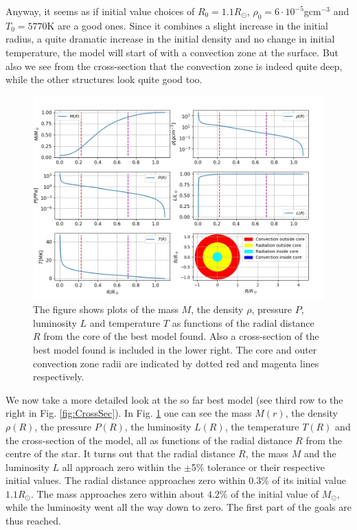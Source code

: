 \documentclass{emulateapj}
\begin{document}
	Anyway, it seems as if initial value choices of $R_0=1.1R_\odot$, $\rho_0 = 6\cdot 10^{-5}$gcm$^{-3}$ and $T_0 = 5770$K are a good ones. Since it combines a slight increase in the initial radius, a quite dramatic increase in the initial density and no change in initial temperature, the model will start of with a convection zone at the surface. But also we see from the cross-section that the convection zone is indeed quite deep, while the other structures look quite good too. 
	
	\begin{figure}
		\includegraphics[width=\textwidth]{modelbest.jpg}
		\caption{The figure shows plots of the mass $M$, the density $\rho$, pressure $P$, luminosity $L$ and temperature $T$ as functions of the radial distance $R$ from the core of the best model found. Also a cross-section of the best model found is included in the lower right. The core and outer convection zone radii are indicated by dotted red and magenta lines respectively.}
		\label{fig:modelbest}
	\end{figure}
	
	We now take a more detailed look at the so far best model (see third row to the right in Fig. \ref{fig:CrossSec}). In Fig. \ref{fig:modelbest} one can see the mass $M(r)$, the density $\rho(R)$, the pressure $P(R)$, the luminosity $L(R)$, the temperature $T(R)$ and the cross-section of the model, all as functions of the radial distance $R$ from the centre of the star. It turns out that the radial distance $R$, the mass $M$ and the luminosity $L$ all approach zero within the $\pm$5\% tolerance or their respective initial values. The radial distance approaches zero within 0.3\% of its initial value $1.1R_\odot$. The mass approaches zero within about $4.2$\% of the initial value of $M_\odot$, while the luminosity went all the way down to zero. The first part of the goals are thus reached.
	
\end{document}
